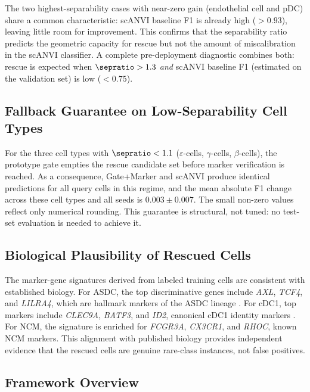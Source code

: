 The two highest-separability cases with near-zero gain (endothelial cell and pDC) share a common characteristic: scANVI baseline F1 is already high ($> 0.93$), leaving little room for improvement. This confirms that the separability ratio predicts the geometric capacity for rescue but not the amount of miscalibration in the scANVI classifier. A complete pre-deployment diagnostic combines both: rescue is expected when $\sepratio > 1.3$ \emph{and} scANVI baseline F1 (estimated on the validation set) is low ($< 0.75$).

\subsection{Fallback Guarantee on Low-Separability Cell Types}
\label{sec:fallback}

For the three cell types with $\sepratio < 1.1$ ($\varepsilon$-cells, $\gamma$-cells, $\beta$-cells), the prototype gate empties the rescue candidate set before marker verification is reached. As a consequence, Gate+Marker and scANVI produce identical predictions for all query cells in this regime, and the mean absolute F1 change across these cell types and all seeds is $0.003 \pm 0.007$. The small non-zero values reflect only numerical rounding. This guarantee is structural, not tuned: no test-set evaluation is needed to achieve it.

\subsection{Biological Plausibility of Rescued Cells}
\label{sec:markers}

The marker-gene signatures derived from labeled training cells are consistent with established biology. For ASDC, the top discriminative genes include \textit{AXL}, \textit{TCF4}, and \textit{LILRA4}, which are hallmark markers of the ASDC lineage \citep{villani2017single}. For cDC1, top markers include \textit{CLEC9A}, \textit{BATF3}, and \textit{ID2}, canonical cDC1 identity markers \citep{villani2017single}. For NCM, the signature is enriched for \textit{FCGR3A}, \textit{CX3CR1}, and \textit{RHOC}, known NCM markers. This alignment with published biology provides independent evidence that the rescued cells are genuine rare-class instances, not false positives.

\subsection{Framework Overview}
\label{sec:framework}

